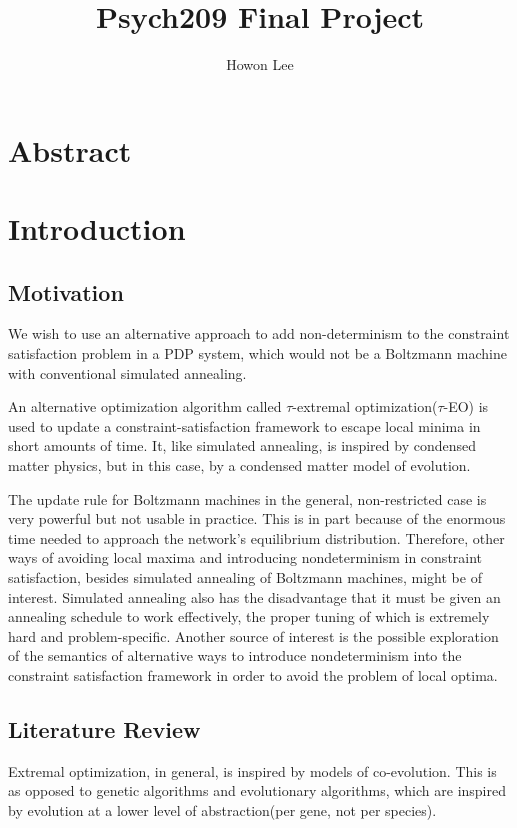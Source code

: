 \documentclass[12pt]{article}
\begin{document}
\title{Psych209 Final Project}
\author{Howon Lee}
\maketitle
\section*{Abstract}
\section*{Introduction}
\subsection*{Motivation}

We wish to use an alternative approach to add non-determinism to the constraint satisfaction problem in a PDP system, which would not be a Boltzmann machine with conventional simulated annealing.

An alternative optimization algorithm called $\tau$-extremal optimization($\tau$-EO) is used to update a constraint-satisfaction framework to escape local minima in short amounts of time. It, like simulated annealing, is inspired by condensed matter physics, but in this case, by a condensed matter model of evolution.

The update rule for Boltzmann machines in the general, non-restricted case is very powerful but not usable in practice. This is in part because of the enormous time needed to approach the network's equilibrium distribution. Therefore, other ways of avoiding local maxima and introducing nondeterminism in constraint satisfaction, besides simulated annealing of Boltzmann machines, might be of interest. Simulated annealing also has the disadvantage that it must be given an annealing schedule to work effectively, the proper tuning of which is extremely hard and problem-specific. Another source of interest is the possible exploration of the semantics of alternative ways to introduce nondeterminism into the constraint satisfaction framework in order to avoid the problem of local optima.

\subsection*{Literature Review}
Extremal optimization, in general, is inspired by models of co-evolution. This is as opposed to genetic algorithms and evolutionary algorithms, which are inspired by evolution at a lower level of abstraction(per gene, not per species).
\end{document}
